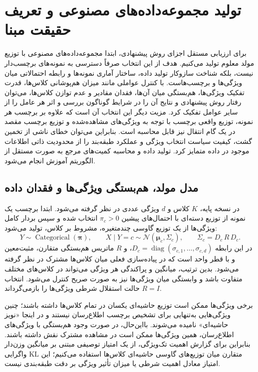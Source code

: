 \section{تولید مجموعه‌داده‌های مصنوعی و تعریف حقیقت مبنا}
\label{sec:ch4-synthetic-data}
برای ارزیابی مستقل اجزای روش پیشنهادی، ابتدا مجموعه‌داده‌های مصنوعی با توزیع مولد معلوم تولید می‌کنیم. هدف از این انتخاب صرفاً دسترسی به نمونه‌های برچسب‌دار نیست، بلکه شناخت سازوکار تولید داده، ساختار آماری نمونه‌ها و رابطه احتمالاتی میان ویژگی‌ها و برچسب‌هاست. با کنترل عواملی مانند میزان هم‌پوشانی کلاس‌ها، قدرت تفکیک ویژگی‌ها، هم‌بستگی میان آن‌ها، فقدان مقادیر و عدم توازن کلاس‌ها، می‌توان رفتار روش پیشنهادی و نتایج آن را در شرایط گوناگون بررسی و اثر هر عامل را از سایر عوامل تفکیک کرد. مزیت دیگر این انتخاب آن است که علاوه بر برچسب هر نمونه، توزیع واقعی برچسب با توجه به ویژگی‌های مشاهده‌شده و توزیع برچسب مقصد در یک گام انتقال نیز قابل محاسبه است. بنابراین می‌توان خطای ناشی از تخمین گشت، کیفیت سیاست انتخاب ویژگی و عملکرد طبقه‌بند را از محدودیت ذاتی اطلاعات موجود در داده متمایز کرد. تولید داده و محاسبه کمیت‌های مرجع به صورت مستقل از الگوریتم آموزش انجام می‌شود.

\subsection{مدل مولد، هم‌بستگی ویژگی‌ها و فقدان داده}
\label{subsec:ch4-synthetic-model}
در نسخه پایه، $K$ کلاس و $d$ ویژگی عددی در نظر گرفته می‌شود. ابتدا برچسب یک نمونه از توزیع دسته‌ای با احتمال‌های پیشین $\pi_c>0$ انتخاب شده و سپس بردار کامل ویژگی‌ها از یک توزیع گاوسی چندمتغیره، مشروط بر کلاس، تولید می‌شود:
\begin{equation}\label{eq:ch4-synthetic-generative}
\boxed{
Y\sim\operatorname{Categorical}(\boldsymbol\pi),
\qquad
X\mid Y=c\sim\mathcal N(\boldsymbol\mu_c,\Sigma_c),
\qquad
\Sigma_c=D_c\,R\,D_c.
}
\end{equation}
در این رابطه $D_c=\operatorname{diag}(\sigma_{c,1},\ldots,\sigma_{c,d})$، و $R$ ماتریس هم‌بستگی متقارن، مثبت‌معین و با قطر واحد است که در پیاده‌سازی فعلی میان کلاس‌ها مشترک در نظر گرفته می‌شود. بدین ترتیب، میانگین و پراکندگی هر ویژگی می‌تواند در کلاس‌های مختلف متفاوت باشد و وابستگی میان ویژگی‌ها نیز به صورت صریح کنترل می‌شود. انتخاب $R=I$ حالت استقلال شرطی ویژگی‌ها را بازمی‌گرداند.

برخی ویژگی‌ها ممکن است توزیع حاشیه‌ای یکسان در تمام کلاس‌ها داشته باشند؛ چنین ویژگی‌هایی به‌تنهایی برای تشخیص برچسب اطلاع‌رسان نیستند و در اینجا «نویز حاشیه‌ای» نامیده می‌شوند. بااین‌حال، در صورت وجود هم‌بستگی با ویژگی‌های اطلاع‌رسان، همین ویژگی‌ها ممکن است در مشاهده مشترک نقش داشته باشند. بنابراین برای گزارش اهمیت تک‌ویژگی، از یک امتیاز توصیفی مبتنی بر میانگین وزن‌دار واگرایی KL متقارن میان توزیع‌های گاوسی حاشیه‌ای کلاس‌ها استفاده می‌کنیم؛ این امتیاز معادل اهمیت شرطی یا میزان تأثیر ویژگی بر دقت طبقه‌بندی نیست.

